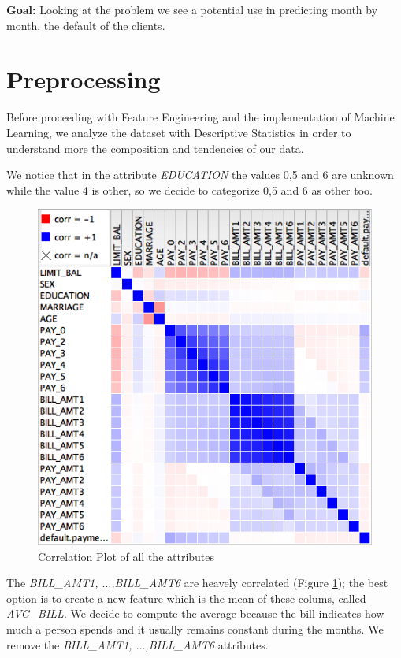 \documentclass[fleqn,10pt]{SelfArx} %
\begin{document}
	
	\textbf{Goal:}\newline
	Looking at the problem we see a potential use in predicting month by month, the default of the clients.
	
	\section{Preprocessing}
	Before proceeding with Feature Engineering and the  implementation of Machine Learning, we analyze the dataset with Descriptive Statistics in order to understand more the composition and tendencies of our data.
	
	We notice that in the attribute \textit{EDUCATION} the values 0,5 and 6 are unknown while the value 4 is other, so we decide to categorize 0,5 and 6 as other too.
	\begin{figure}[h]
		\includegraphics[width=\linewidth]{correlation.png}
		\caption{Correlation Plot of all the attributes}
		\label{fig:corr}
	\end{figure}
	
	
	The \textit{BILL\_AMT1, $\hdots$,BILL\_AMT6} are heavely correlated (Figure \ref{fig:corr}); the best option is to create a new feature which is the mean of these colums, called \textit{AVG\_BILL}.
	We decide to compute the average because the bill indicates how much a person spends and it usually remains constant during the months. We remove the \textit{BILL\_AMT1, $\hdots$,BILL\_AMT6} attributes.
	
\end{document}
